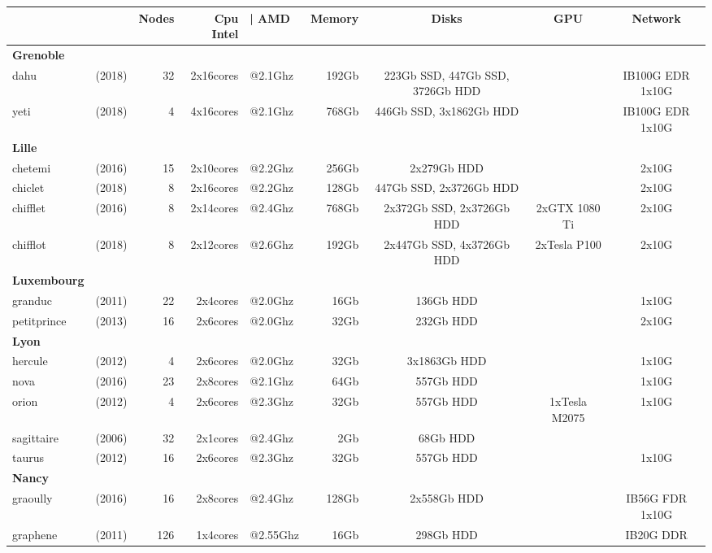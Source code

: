 \begin{center}
\begin{tabular}{|lr|r|rl|r|c|c|c|}
\hline
  & & \textbf{Nodes} & \textbf{Cpu Intel}&\textbf{| AMD} & \textbf{Memory} & \textbf{Disks} & \textbf{GPU} & \textbf{Network} \\ 
\hline
\textbf{Grenoble} &  &  &  &  &  &  &  &  \\
dahu & (2018) & 32 & 2x16cores & @2.1Ghz & 192Gb &  223Gb SSD, 447Gb SSD, 3726Gb HDD &  & IB100G EDR 1x10G \\
yeti & (2018) & 4 & 4x16cores & @2.1Ghz & 768Gb &  446Gb SSD, 3x1862Gb HDD &  & IB100G EDR 1x10G \\
\textbf{Lille} &  &  &  &  &  &  &  &  \\
chetemi & (2016) & 15 & 2x10cores & @2.2Ghz & 256Gb &  2x279Gb HDD &  &  2x10G \\
chiclet & (2018) & 8 & 2x16cores & @2.2Ghz & 128Gb &  447Gb SSD, 2x3726Gb HDD &  &  2x10G \\
chifflet & (2016) & 8 & 2x14cores & @2.4Ghz & 768Gb &  2x372Gb SSD, 2x3726Gb HDD & 2xGTX 1080 Ti &  2x10G \\
chifflot & (2018) & 8 & 2x12cores & @2.6Ghz & 192Gb &  2x447Gb SSD, 4x3726Gb HDD & 2xTesla P100 &  2x10G \\
\textbf{Luxembourg} &  &  &  &  &  &  &  &  \\
granduc & (2011) & 22 & 2x4cores & @2.0Ghz & 16Gb &  136Gb HDD &  &  1x10G \\
petitprince & (2013) & 16 & 2x6cores & @2.0Ghz & 32Gb &  232Gb HDD &  &  2x10G \\
\textbf{Lyon} &  &  &  &  &  &  &  &  \\
hercule & (2012) & 4 & 2x6cores & @2.0Ghz & 32Gb &  3x1863Gb HDD &  &  1x10G \\
nova & (2016) & 23 & 2x8cores & @2.1Ghz & 64Gb &  557Gb HDD &  &  1x10G \\
orion & (2012) & 4 & 2x6cores & @2.3Ghz & 32Gb &  557Gb HDD & 1xTesla M2075 &  1x10G \\
sagittaire & (2006) & 32 & 2x1cores & @2.4Ghz & 2Gb &  68Gb HDD &  &  \\
taurus & (2012) & 16 & 2x6cores & @2.3Ghz & 32Gb &  557Gb HDD &  &  1x10G \\
\textbf{Nancy} &  &  &  &  &  &  &  &  \\
graoully & (2016) & 16 & 2x8cores & @2.4Ghz & 128Gb &  2x558Gb HDD &  & IB56G FDR 1x10G \\
graphene & (2011) & 126 & 1x4cores & @2.55Ghz & 16Gb &  298Gb HDD &  & IB20G DDR \\

\end{tabular}
\end{center}
